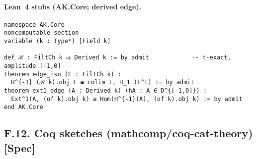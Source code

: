 \documentclass[11pt]{article}
\numberwithin{equation}{section}
\theoremstyle{plain}
\theoremstyle{definition}
\theoremstyle{remark}
\theoremstyle{plain}
\theoremstyle{definition}
\numberwithin{equation}{section}
\theoremstyle{definition}
\numberwithin{equation}{section}
\theoremstyle{plain}
\theoremstyle{definition}
\theoremstyle{remark}
\begin{document}
\paragraph{Lean~4 stubs (AK.Core; derived edge).}
\begin{verbatim}
namespace AK.Core
noncomputable section
variable (k : Type*) [Field k]

def ℛ : FiltCh k ⥤ Derived k := by admit            -- t-exact, amplitude [-1,0]
theorem edge_iso (F : FiltCh k) :
  H^{-1} (ℛ k).obj F ≅ colim t, H_1 (F^t) := by admit
theorem ext1_edge (A : Derived k) (hA : A ∈ D^{[-1,0]}) :
  Ext^1(A, (of k).obj k) ≅ Hom(H^{-1}(A), (of k).obj k) := by admit
end AK.Core
\end{verbatim}

\subsection*{F.12. Coq sketches (mathcomp/coq-cat-theory) [Spec]}
\end{document}
